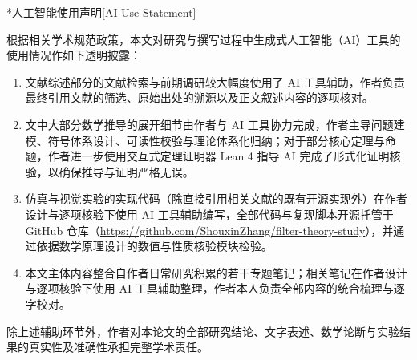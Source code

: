 \makeatletter
\ifhit@openright\cleardoublepage\else\clearpage\fi
{}[AI Use Statement]
\makeatother

根据相关学术规范政策，本文对研究与撰写过程中生成式人工智能（AI）工具的使用情况作如下透明披露：
\begin{enumerate}[label=(\arabic*),leftmargin=0pt,labelindent=2\ccwd,itemindent=*,labelsep=0.4em,nosep]
  \item 文献综述部分的文献检索与前期调研较大幅度使用了 AI 工具辅助，作者负责最终引用文献的筛选、原始出处的溯源以及正文叙述内容的逐项核对。
  \item 文中大部分数学推导的展开细节由作者与 AI 工具协力完成，作者主导问题建模、符号体系设计、可读性校验与理论体系化归纳；对于部分核心定理与命题，作者进一步使用交互式定理证明器 Lean 4 指导 AI 完成了形式化证明核验，以确保推导与证明严格无误。
  \item 仿真与视觉实验的实现代码（除直接引用相关文献的既有开源实现外）在作者设计与逐项核验下使用 AI 工具辅助编写，全部代码与复现脚本开源托管于 GitHub 仓库（\url{https://github.com/ShouxinZhang/filter-theory-study}），并通过依据数学原理设计的数值与性质核验模块检验。
  \item 本文主体内容整合自作者日常研究积累的若干专题笔记；相关笔记在作者设计与逐项核验下使用 AI 工具辅助整理，作者本人负责全部内容的统合梳理与逐字校对。
\end{enumerate}

除上述辅助环节外，作者对本论文的全部研究结论、文字表述、数学论断与实验结果的真实性及准确性承担完整学术责任。
